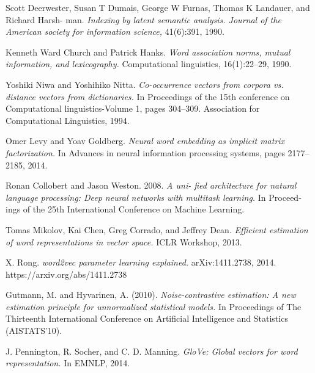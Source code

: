 \documentclass[11pt]{article}
\begin{document}
\begin{thebibliography}{9}
Scott Deerwester, Susan T Dumais, George W Furnas, Thomas K Landauer, and Richard Harsh-
man. \textit{Indexing by latent semantic analysis. Journal of the American society for information
science,} 41(6):391, 1990.

Kenneth Ward Church and Patrick Hanks. \textit{ Word association norms, mutual information, and
lexicography.} Computational linguistics, 16(1):22–29, 1990.

Yoshiki Niwa and Yoshihiko Nitta. \textit{Co-occurrence vectors from corpora vs. distance vectors from
dictionaries.} In Proceedings of the 15th conference on Computational linguistics-Volume 1, pages
304–309. Association for Computational Linguistics, 1994.


Omer Levy and Yoav Goldberg. \textit{Neural word embedding as implicit matrix factorization.} In
Advances in neural information processing systems, pages 2177–2185, 2014.

Ronan Collobert and Jason Weston. 2008. \textit{ A uni-
fied architecture for natural language processing: Deep
neural networks with multitask learning.} In Proceed-
ings of the 25th International Conference on Machine
Learning.

Tomas Mikolov, Kai Chen, Greg Corrado, and Jeffrey Dean. \textit{Efficient estimation of word representations
in vector space.} ICLR Workshop, 2013.

X. Rong. \textit{word2vec parameter learning explained.} arXiv:1411.2738, 2014.
https://arxiv.org/abs/1411.2738

Gutmann, M. and Hyvarinen, A. (2010). \textit{ Noise-contrastive estimation: A new estimation principle for
unnormalized statistical models.} In Proceedings of The Thirteenth International Conference on Artificial
Intelligence and Statistics (AISTATS’10).

J. Pennington, R. Socher, and C. D. Manning. \textit{GloVe: Global vectors for word representation.} In EMNLP, 2014.

\end{thebibliography}
\end{document}
